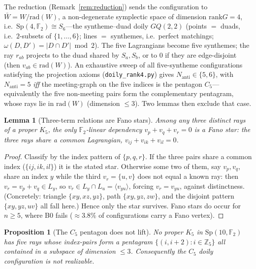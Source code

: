 \documentclass[11pt,a4paper]{article}
\newtheorem{lemma}[theorem]{Lemma}
\newtheorem{proposition}[theorem]{Proposition}
\theoremstyle{remark}
\newcommand{\Sp}{\mathrm{Sp}}
\newcommand{\rad}{\mathrm{rad}}
\newcommand{\rank}{\mathrm{rank}}
\newcommand{\Nanti}{N_{\mathrm{anti}}}
\begin{document}
The reduction (Remark~\ref{rem:reduction}) sends the configuration to
$\bar W=W/\rad(W)$, a non-degenerate symplectic space of dimension $\rank G=4$, i.e.\
$\Sp(4,\mathbb F_2)\cong S_6$---the syntheme--duad doily $GQ(2,2)$ (points $=$ duads,
i.e.\ $2$-subsets of $\{1,\dots,6\}$; lines $=$ synthemes, i.e.\ perfect matchings;
$\omega(D,D')=|D\cap D'|\bmod2$). The five Lagrangians become five synthemes; the ray
$r_{ab}$ projects to the duad shared by $S_a,S_b$, or to $0$ if they are edge-disjoint
(then $v_{ab}\in\rad(W)$). An exhaustive sweep of all five-syntheme configurations
satisfying the projection axioms (\texttt{doily\_rank4.py}) gives $\Nanti\in\{5,6\}$,
with $\Nanti=5$ \emph{iff} the meeting-graph on the five indices is the pentagon
$C_5$---equivalently the five non-meeting pairs form the complementary pentagram, whose
rays lie in $\rad(W)$ (dimension $\le3$). Two lemmas then exclude that case.

\begin{lemma}[Three-term relations are Fano stars]\label{lem:3term}
Among any three distinct rays of a proper $K_5$, the only $\mathbb F_2$-linear
dependency $v_p+v_q+v_r=0$ is a \emph{Fano star}: the three rays share a common
Lagrangian, $v_{ij}+v_{ik}+v_{il}=0$.
\end{lemma}

\begin{proof}
Classify by the index pattern of $\{p,q,r\}$. If the three pairs share a common
index ($\{ij,ik,il\}$) it is the stated star. Otherwise some two of them, say
$v_p,v_q$, share an index $y$ while the third $v_r=\{u,v\}$ does not equal a known
ray: then $v_r=v_p+v_q\in L_y$, so $v_r\in L_y\cap L_u=\langle v_{yu}\rangle$, forcing
$v_r=v_{yu}$, against distinctness. (Concretely: triangle $\{xy,xz,yz\}$, path
$\{xy,yz,zw\}$, and the disjoint pattern $\{xy,yz,uv\}$ all fall here.) Hence only the
star survives. Fano stars do occur for $n\ge5$, where B0 fails ($\approx3.8\%$ of
configurations carry a Fano vertex).
\end{proof}

\begin{proposition}[The $C_5$ pentagon does not lift]\label{prop:c5}
No proper $K_5$ in $\Sp(10,\mathbb F_2)$ has five rays whose index-pairs form a
pentagram $\{(i,i+2):i\in\mathbb Z_5\}$ all contained in a subspace of dimension
$\le3$. Consequently the $C_5$ doily configuration is not realizable.
\end{proposition}
\end{document}
